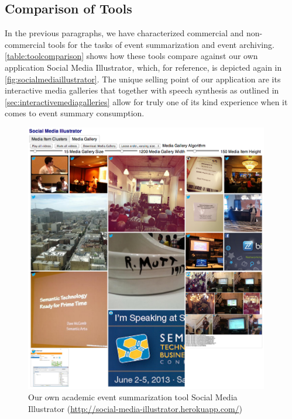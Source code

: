 \subsection{Comparison of Tools}

In the previous paragraphs, we have characterized
commercial and non-commercial tools for the tasks
of event summarization and event archiving. 
\autoref{table:toolcomparison} shows how these tools
compare against our own application Social Media Illustrator,
which, for reference, is depicted again in \autoref{fig:socialmediaillustrator}.
The unique selling point of our application
are its interactive media galleries that together with speech synthesis
as outlined in \autoref{sec:interactivemediagalleries}
allow for truly one of its kind experience when it comes to 
event summary consumption.

\begin{figure}
  \centering
  \includegraphics[width=0.95\textwidth,height=0.9\textheight,keepaspectratio]{socialmediaillustrator.png}
  \caption[Our own academic event summarization tool Social Media Illustrator]{Our own academic event summarization tool Social Media Illustrator (\url{http://social-media-illustrator.herokuapp.com/})}
  \label{fig:socialmediaillustrator}
\end{figure}

